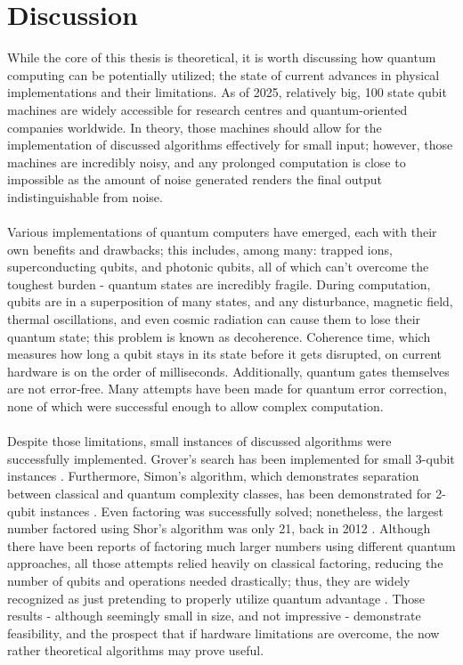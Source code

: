 \section{Discussion}
While the core of this thesis is theoretical, it is worth discussing how quantum computing can be potentially utilized; the state of current advances in physical implementations and their limitations. As of 2025, relatively big, 100 state qubit machines are widely accessible for research centres and quantum-oriented companies worldwide. In theory, those machines should allow for the implementation of discussed algorithms effectively for small input; however, those machines are incredibly noisy, and any prolonged computation is close to impossible as the amount of noise generated renders the final output indistinguishable from noise. \\\\
Various implementations of quantum computers have emerged, each with their own benefits and drawbacks; this includes, among many: trapped ions, superconducting qubits, and photonic qubits, all of which can't overcome the toughest burden - quantum states are incredibly fragile. During computation, qubits are in a superposition of many states, and any disturbance, magnetic field, thermal oscillations, and even cosmic radiation can cause them to lose their quantum state; this problem is known as decoherence. Coherence time, which measures how long a qubit stays in its state before it gets disrupted, on current hardware is on the order of milliseconds. Additionally, quantum gates themselves are not error-free. Many attempts have been made for quantum error correction, none of which were successful enough to allow complex computation.
\\\\
Despite those limitations, small instances of discussed algorithms were successfully implemented. Grover's search has been implemented for small 3-qubit instances \cite{Figgatt2017Grover}. Furthermore, Simon's algorithm, which demonstrates separation between classical and quantum complexity classes, has been demonstrated for 2-qubit instances \cite{Tame2014}. Even factoring was successfully solved; nonetheless, the largest number factored using Shor's algorithm was only 21, back in 2012 \cite{shor21}. Although there have been reports of factoring much larger numbers using different quantum approaches, all those attempts relied heavily on classical factoring, reducing the number of qubits and operations needed drastically; thus, they are widely recognized as just pretending to properly utilize quantum advantage \cite{Smolin_2013}. Those results - although seemingly small in size, and not impressive - demonstrate feasibility, and the prospect that if hardware limitations are overcome, the now rather theoretical algorithms may prove useful.
